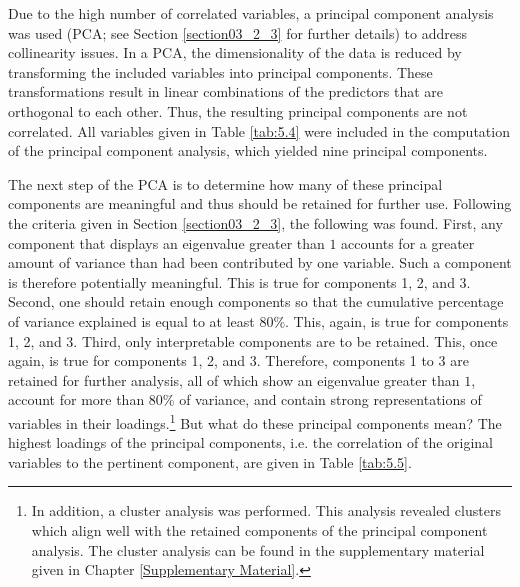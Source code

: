 Due to the high number of correlated variables, a principal component analysis was used (PCA; see Section \ref{section03_2_3} for further details) to address collinearity issues. In a PCA, the dimensionality of the data is reduced by transforming the included variables into principal components. These transformations result in linear combinations of the predictors that are orthogonal to each other. Thus, the resulting principal components are not correlated. All variables given in Table \ref{tab:5.4} were included in the computation of the principal component analysis, which yielded nine principal components. 

The next step of the PCA is to determine how many of these principal components are meaningful and thus should be retained for further use. Following the criteria given in Section \ref{section03_2_3}, the following was found. First, any component that displays an eigenvalue greater than $1$ accounts for a greater amount of variance than had been contributed by one variable. Such a component is therefore potentially meaningful. This is true for components 1, 2, and 3. Second, one should retain enough components so that the cumulative percentage of variance explained is equal to at least 80\%. This, again, is true for components 1, 2, and 3. Third, only interpretable components are to be retained. This, once again, is true for components 1, 2, and 3. Therefore, components 1 to 3 are retained for further analysis, all of which show an eigenvalue greater than $1$, account for more than 80\% of variance, and contain strong representations of variables in their loadings.\footnote{In addition, a cluster analysis was performed. This analysis revealed clusters which align well with the retained components of the principal component analysis. The cluster analysis can be found in the supplementary material given in Chapter \ref{Supplementary Material}.} But what do these principal components mean? The highest loadings of the principal components, i.e. the correlation of the original variables to the pertinent component, are given in Table \ref{tab:5.5}.

